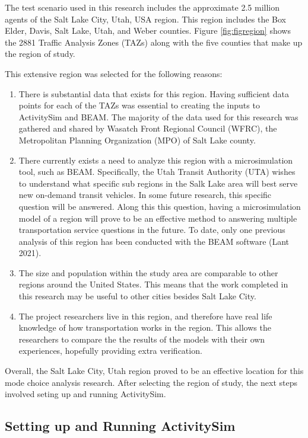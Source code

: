 \documentclass[12pt, oneside, openright]{byuthesis}
\providecommand{\tightlist}{%
  \setlength{\itemsep}{0pt}\setlength{\parskip}{0pt}}
\begin{document}
The test scenario used in this research includes the approximate 2.5 million agents of the Salt Lake City, Utah, USA region. This region includes the Box Elder, Davis, Salt Lake, Utah, and Weber counties. Figure \ref{fig:figregion} shows the 2881 Traffic Analysis Zones (TAZs) along with the five counties that make up the region of study.

This extensive region was selected for the following reasons:

\begin{enumerate}
\def\labelenumi{\arabic{enumi}.}
\tightlist
\item
  There is substantial data that exists for this region. Having sufficient data points for each of the TAZs was essential to creating the inputs to ActivitySim and BEAM. The majority of the data used for this research was gathered and shared by Wasatch Front Regional Council (WFRC), the Metropolitan Planning Organization (MPO) of Salt Lake county.
\item
  There currently exists a need to analyze this region with a microsimulation tool, such as BEAM. Specifically, the Utah Transit Authority (UTA) wishes to understand what specific sub regions in the Salk Lake area will best serve new on-demand transit vehicles. In some future research, this specific question will be answered. Along this this question, having a microsimulation model of a region will prove to be an effective method to answering multiple transportation service questions in the future. To date, only one previous analysis of this region has been conducted with the BEAM software (Lant 2021).
\item
  The size and population within the study area are comparable to other regions around the United States. This means that the work completed in this research may be useful to other cities besides Salt Lake City.
\item
  The project researchers live in this region, and therefore have real life knowledge of how transportation works in the region. This allows the researchers to compare the the results of the models with their own experiences, hopefully providing extra verification.
\end{enumerate}

Overall, the Salt Lake City, Utah region proved to be an effective location for this mode choice analysis research. After selecting the region of study, the next steps involved seting up and running ActivitySim.

\hypertarget{setting-up-and-running-activitysim}{%
\subsection{Setting up and Running ActivitySim}\label{setting-up-and-running-activitysim}}
\end{document}
